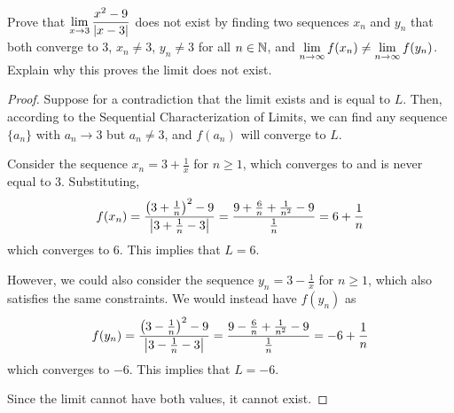 \question Prove that $\displaystyle\lim_{x\to3} \dfrac{x^2-9}{|x-3|}$ does not exist
by finding two sequences $x_n$ and $y_n$ that both converge to 3,
$x_n \neq 3$, $y_n \neq 3$ for all $n\in\mathbb{N}$,
and $\displaystyle\lim_{n\to\infty} f(x_n) \neq \displaystyle\lim_{n\to\infty} f(y_n)$.
Explain why this proves the limit does not exist.
\begin{proof}
  Suppose for a contradiction that the limit exists and is equal to $L$.
  Then, according to the Sequential Characterization of Limits,
  we can find any sequence $\{a_n\}$ with $a_n \to 3$ but $a_n \neq 3$, and $f(a_n)$ will converge to $L$.

  Consider the sequence $x_n = 3+\frac{1}{x}$ for $n \geq 1$, which converges to and is never equal to 3.
  Substituting,
  \begin{equation*}
    f(x_n) = \frac{\left(3+\frac{1}{n}\right)^2 - 9}{\abs{3+\frac{1}{n}-3}}
    = \frac{9+\frac{6}{n}+\frac{1}{n^2} - 9}{\frac{1}{n}}
    = 6+\frac{1}{n}
  \end{equation*}
  which converges to 6.
  This implies that $L = 6$.

  However, we could also consider the sequence $y_n = 3-\frac{1}{x}$ for $n \geq 1$, which also satisfies the same constraints.
  We would instead have $f(y_n)$ as
  \begin{equation*}
    f(y_n) = \frac{\left(3-\frac{1}{n}\right)^2 - 9}{\abs{3-\frac{1}{n}-3}}
    = \frac{9-\frac{6}{n}+\frac{1}{n^2} - 9}{\frac{1}{n}}
    = -6+\frac{1}{n}
  \end{equation*}
  which converges to $-6$.
  This implies that $L = -6$.

  Since the limit cannot have both values, it cannot exist.
\end{proof}

